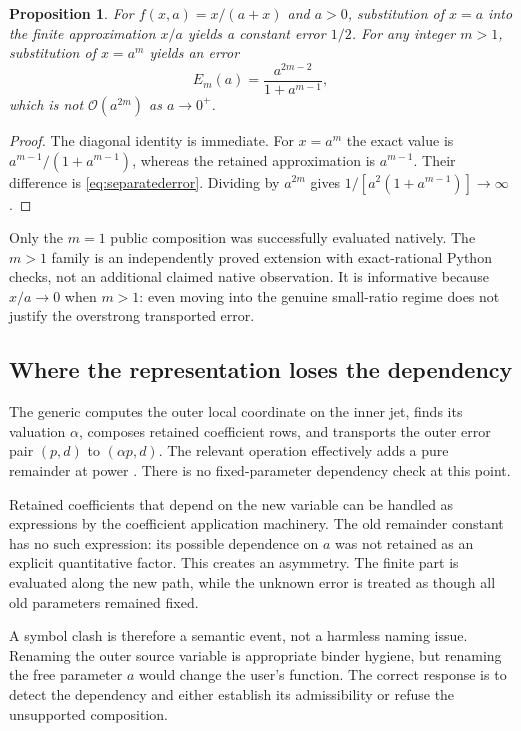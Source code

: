 \documentclass[11pt,letterpaper]{article}
\newcommand{\code}[1]{\texttt{\detokenize{#1}}}
\newcommand{\OO}{\mathcal O}
\newtheorem{proposition}{Proposition}[section]
\begin{document}
\begin{proposition}\label{prop:diagonal}
For $f(x,a)=x/(a+x)$ and $a>0$, substitution of $x=a$ into the finite approximation $x/a$ yields a constant error $1/2$. For any integer $m>1$, substitution of $x=a^m$ yields an error
\begin{equation}\label{eq:separatederror}
 E_m(a)=\frac{a^{2m-2}}{1+a^{m-1}},
\end{equation}
which is not $\OO(a^{2m})$ as $a\to0^+$.
\end{proposition}
\begin{proof}
The diagonal identity is immediate. For $x=a^m$ the exact value is
$a^{m-1}/(1+a^{m-1})$, whereas the retained approximation is $a^{m-1}$.
Their difference is \eqref{eq:separatederror}. Dividing by $a^{2m}$ gives
$1/[a^2(1+a^{m-1})]\to\infty$.
\end{proof}
Only the $m=1$ public composition was successfully evaluated natively. The $m>1$ family is an independently proved extension with exact-rational Python checks, not an additional claimed native observation. It is informative because $x/a\to0$ when $m>1$: even moving into the genuine small-ratio regime does not justify the overstrong transported error.

\subsection{Where the representation loses the dependency}
The generic \code{SeriesCompose} computes the outer local coordinate on the inner jet, finds its valuation $\alpha$, composes retained coefficient rows, and transports the outer error pair $(p,d)$ to $(\alpha p,d)$. The relevant operation effectively adds a pure remainder at power \code{alpha p}. There is no fixed-parameter dependency check at this point.\cite{operations}

Retained coefficients that depend on the new variable can be handled as expressions by the coefficient application machinery. The old remainder constant has no such expression: its possible dependence on $a$ was not retained as an explicit quantitative factor. This creates an asymmetry. The finite part is evaluated along the new path, while the unknown error is treated as though all old parameters remained fixed.

A symbol clash is therefore a semantic event, not a harmless naming issue. Renaming the outer source variable is appropriate binder hygiene, but renaming the free parameter $a$ would change the user's function. The correct response is to detect the dependency and either establish its admissibility or refuse the unsupported composition.
\end{document}

